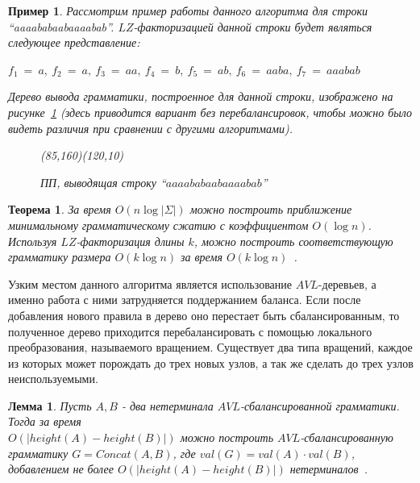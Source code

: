 \documentclass[12pt,a4paper]{extarticle}
\theoremstyle{break}
\newtheorem{theorem}{Теорема}
\newtheorem{lemma}{Лемма}
\newtheorem{example}{Пример}
\begin{document}
\begin{example}
Рассмотрим пример работы данного алгоритма для строки ``aaaababaabaaaabab''.
$LZ$-факторизацией данной строки будет являться следующее представление:
\begin{center}
$f_1\ =\ a,\ f_2\ =\ a,\ f_3\ =\ aa,\ f_4\ =\ b,\ f_5\ =\ ab,\ f_6\ =\ aaba,\
f_7\ =\ aaabab$
\end{center}
Дерево вывода грамматики, построенное для данной строки, изображено на
рисунке~\ref{rytter_slp} (здесь приводится вариант без перебалансировок, чтобы
можно было видеть различия при сравнении с другими алгоритмами).

\begin{figure}[!h]
    \begin{center}
        \begin{picture}(85,160)(120,10)
            \picRytter{}
        \end{picture}
    \end{center}
    \caption{ПП, выводящая строку ``$aaaababaabaaaabab$''}
    \label{rytter_slp}
\end{figure}

\end{example}

\begin{theorem}
За время $O(n\log |\Sigma|)$ можно построить
приближение минимальному грамматическому сжатию с коэффициентом $O(\log n)$. 
Используя $LZ$-факторизация длины $k$, можно построить соответствующую
грамматику размера $O(k\log n)$ за время $O(k\log n)$~\cite{rytter}.
\end{theorem} 

Узким местом данного алгоритма является использование $AVL$-деревьев, а именно
работа с ними затрудняется поддержанием баланса. Если после добавления нового
правила в дерево оно перестает быть сбалансированным, то полученное дерево
приходится перебалансировать с помощью локального преобразования, называемого
вращением. Существует два типа вращений, каждое из которых может порождать до
трех новых узлов, а так же сделать до трех узлов неиспользуемыми.

\begin{lemma}
Пусть $A, B$ - два нетерминала $AVL$-сбалансированной
грамматики. Тогда за время \\$O(|height(A)-height(B)|)$ можно построить
$AVL$-сбалансированную грамматику $G = Concat(A,B)$, где $val(G) = val(A) \cdot
val(B)$, добавлением не более $O(|height(A)-height(B)|)$ нетерминалов~\cite{rytter}.
\end{lemma}
\end{document}
